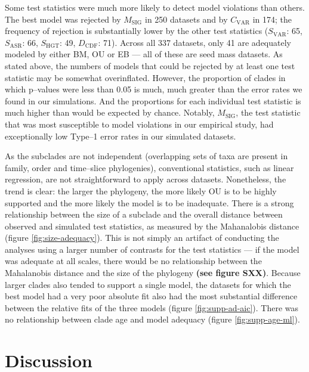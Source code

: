 \documentclass[a4paper,11pt]{article}
\begin{document}
Some test statistics were much more likely to detect model violations than others. The best model was rejected by $M_{\text{SIG}}$ in 250 datasets and by $C_{\text{VAR}}$ in 174; the frequency of rejection is substantially lower by the other test statistics ($S_{\text{VAR}}$: 65, $S_{\text{ASR}}$: 66, $S_{\text{HGT}}$: 49, $D_{\text{CDF}}$: 71).
Across all 337 datasets, only 41 are adequately modeled by either BM, OU or EB --- all of these are seed mass datasets. As stated above, the numbers of models that could be rejected by at least one test statistic may be somewhat overinflated. However, the proportion of clades in which p--values were less than 0.05 is much, much greater than the error rates we found in our simulations. And the proportions for each individual test statistic is much higher than would be expected by chance. Notably, $M_{\text{SIG}}$, the test statistic that was most susceptible to model violations in our empirical study, had exceptionally low Type--1 error rates in our simulated datasets.

As the subclades are not independent (overlapping sets of taxa are present in family, order and time--slice phylogenies), conventional statistics, such as linear regression, are not straightforward to apply across datasets. Nonetheless, the trend is clear: the larger the phylogeny, the more likely OU is to be highly supported and the more likely the model is to be inadequate. There is a strong relationship between the size of a subclade and the overall distance between observed and simulated test statistics, as measured by the Mahanalobis distance (figure \ref{fig:size-adequacy}). This is not simply an artifact of conducting the analyses using a larger number of contrasts for the test statistics --- if the model was adequate at all scales, there would be no relationship between the Mahalanobis distance and the size of the phylogeny \textbf{(see figure SXX)}. Because larger clades also tended to support a single model, the datasets for which the best model had a very poor absolute fit also had the most substantial difference between the relative fits of the three models (figure \ref{fig:supp-ad-aic}). There was no relationship between clade age and model adequacy (figure \ref{fig:supp-age-ml}).

\section{Discussion}
\end{document}
